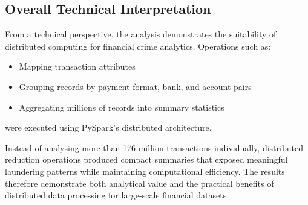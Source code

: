 \subsection{Overall Technical Interpretation}

From a technical perspective, the analysis demonstrates the suitability of distributed
computing for financial crime analytics. Operations such as:

\begin{itemize}
    \item Mapping transaction attributes
    \item Grouping records by payment format, bank, and account pairs
    \item Aggregating millions of records into summary statistics
\end{itemize}

were executed using PySpark's distributed architecture.

Instead of analysing more than 176 million transactions individually, distributed
reduction operations produced compact summaries that exposed meaningful laundering
patterns while maintaining computational efficiency. The results therefore demonstrate
both analytical value and the practical benefits of distributed data processing for large-scale financial datasets.